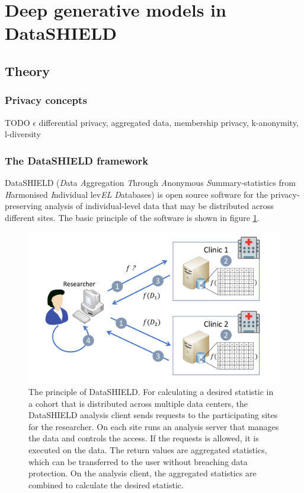 \documentclass[12pt]{article}
\newcommand{\circlenum}[1]{\raisebox{.5pt}{\textcircled{\raisebox{-.9pt} {#1}}}}
\begin{document}
\section{Deep generative models in DataSHIELD}



\subsection{Theory}

\subsubsection{Privacy concepts}
TODO $\epsilon$ differential privacy, aggregated data, membership privacy, k-anonymity, l-diversity

\subsubsection{The DataSHIELD framework}

DataSHIELD ({\em D}ata {\em A}ggregation {\em T}hrough
{\em A}nonymous {\em S}ummary-statistics from {\em H}armonised {\em I}ndividual
lev{\em EL} {\em D}atabases) \citep{budin-ljosne_datashield} is open source software for the privacy-preserving analysis of individual-level data that may be distributed across different sites.
The basic principle of the software is shown in figure \ref{fig:datashieldprinciple}.

 \begin{figure}[h]
   \centering
   \includegraphics[scale=0.6]{images/datashieldprinciple.pdf}
   \caption{The principle of DataSHIELD. For calculating a desired statistic in a cohort that is distributed across multiple data centers, the DataSHIELD analysis client sends requests \circlenum{1} to the participating sites for the researcher. \circlenum{2}On each site runs an analysis server that manages the data and controls the access. If the requests is allowed, it is executed on the data. \circlenum{3}The return values are aggregated statistics, which can be transferred to the user without breaching data protection. \circlenum{4}On the analysis client, the aggregated statistics are combined to calculate the desired statistic.}
   \label{fig:datashieldprinciple}
 \end{figure}
\end{document}
